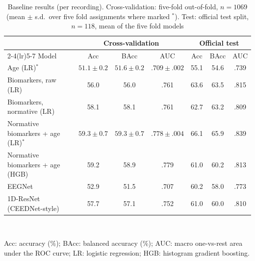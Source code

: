 \begin{table}[H]
\centering
\caption{Baseline results (per recording). Cross-validation: five-fold out-of-fold, $n=1069$ (mean $\pm$
s.d.\ over five fold assignments where marked $^\ast$). Test: official test split, $n=118$, mean of the five
fold models}
\label{tab:baselines}
\small
\begin{tabular}{lcccccc}
\toprule
& \multicolumn{3}{c}{Cross-validation} & \multicolumn{3}{c}{Official test}\\
\cmidrule(lr){2-4}\cmidrule(lr){5-7}
Model & Acc & BAcc & AUC & Acc & BAcc & AUC\\
\midrule
Age (LR)$^\ast$ & $51.1\pm0.2$ & $51.6\pm0.2$ & $.709\pm.002$ & 55.1 & 54.6 & .739\\
Biomarkers, raw (LR) & 56.0 & 56.0 & .761 & 63.6 & 63.5 & .815\\
Biomarkers, normative (LR) & 58.1 & 58.1 & .761 & 62.7 & 63.2 & .809\\
Normative biomarkers + age (LR)$^\ast$ & $59.3\pm0.7$ & $59.3\pm0.7$ & $.778\pm.004$ & 66.1 & 65.9 & .839\\
Normative biomarkers + age (HGB) & 59.2 & 58.9 & .779 & 61.0 & 60.2 & .813\\
EEGNet & 52.9 & 51.5 & .707 & 60.2 & 58.0 & .773\\
1D-ResNet (CEEDNet-style) & 57.7 & 57.1 & .752 & 61.0 & 60.0 & .810\\
\bottomrule
\end{tabular}\\[2pt]
\parbox{\textwidth}{\scriptsize Acc: accuracy (\%); BAcc: balanced accuracy (\%); AUC: macro one-vs-rest area under
the ROC curve; LR: logistic regression; HGB: histogram gradient boosting.}
\end{table}
